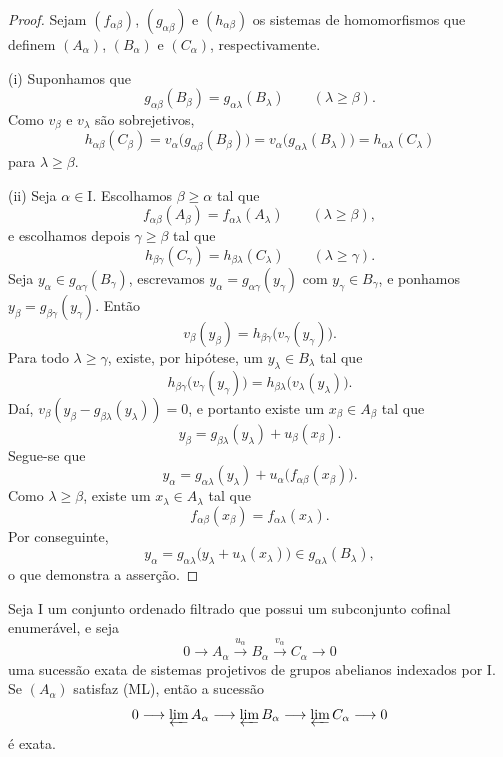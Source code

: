 \begin{proof}
Sejam $(f_{\alpha\beta})$, $(g_{\alpha\beta})$ e
$(h_{\alpha\beta})$ os sistemas de homomorfismos que definem
$(A_\alpha)$, $(B_\alpha)$ e $(C_\alpha)$, respectivamente.

(i) Suponhamos que
\[
  g_{\alpha\beta}(B_\beta)
  =
  g_{\alpha\lambda}(B_\lambda)
  \qquad(\lambda\geq\beta).
\]
Como $v_\beta$ e $v_\lambda$ são sobrejetivos,
\[
  h_{\alpha\beta}(C_\beta)
  =
  v_\alpha\bigl(g_{\alpha\beta}(B_\beta)\bigr)
  =
  v_\alpha\bigl(g_{\alpha\lambda}(B_\lambda)\bigr)
  =
  h_{\alpha\lambda}(C_\lambda)
\]
para $\lambda\geq\beta$.

(ii) Seja $\alpha\in\mathrm{I}$.
Escolhamos $\beta\geq\alpha$ tal que
\[
  f_{\alpha\beta}(A_\beta)
  =
  f_{\alpha\lambda}(A_\lambda)
  \qquad(\lambda\geq\beta),
\]
e escolhamos depois $\gamma\geq\beta$ tal que
\[
  h_{\beta\gamma}(C_\gamma)
  =
  h_{\beta\lambda}(C_\lambda)
  \qquad(\lambda\geq\gamma).
\]
Seja $y_\alpha\in g_{\alpha\gamma}(B_\gamma)$, escrevamos
$y_\alpha=g_{\alpha\gamma}(y_\gamma)$ com $y_\gamma\in B_\gamma$,
e ponhamos $y_\beta=g_{\beta\gamma}(y_\gamma)$.
Então
\[
  v_\beta(y_\beta)
  =
  h_{\beta\gamma}\bigl(v_\gamma(y_\gamma)\bigr).
\]
Para todo $\lambda\geq\gamma$, existe, por hipótese, um
$y_\lambda\in B_\lambda$ tal que
\[
  h_{\beta\gamma}\bigl(v_\gamma(y_\gamma)\bigr)
  =
  h_{\beta\lambda}\bigl(v_\lambda(y_\lambda)\bigr).
\]
Daí,
$v_\beta(y_\beta-g_{\beta\lambda}(y_\lambda))=0$, e portanto
existe um $x_\beta\in A_\beta$
tal que
\[
  y_\beta
  =
  g_{\beta\lambda}(y_\lambda)+u_\beta(x_\beta).
\]
Segue-se que
\[
  y_\alpha
  =
  g_{\alpha\lambda}(y_\lambda)
  +
  u_\alpha\bigl(f_{\alpha\beta}(x_\beta)\bigr).
\]
Como $\lambda\geq\beta$, existe um $x_\lambda\in A_\lambda$ tal
que
\[
  f_{\alpha\beta}(x_\beta)=f_{\alpha\lambda}(x_\lambda).
\]
Por conseguinte,
\[
  y_\alpha
  =
  g_{\alpha\lambda}
  \bigl(y_\lambda+u_\lambda(x_\lambda)\bigr)
  \in g_{\alpha\lambda}(B_\lambda),
\]
o que demonstra a asserção.
\end{proof}

\begin{proposition}[13.2.2]
\label{0.13.2.2}
Seja $\mathrm{I}$ um conjunto ordenado filtrado que possui um subconjunto
cofinal enumerável, e seja
\[
  0\longrightarrow A_\alpha
  \xrightarrow{u_\alpha}B_\alpha
  \xrightarrow{v_\alpha}C_\alpha
  \longrightarrow0
\]
uma sucessão exata de sistemas projetivos de grupos abelianos indexados
por $\mathrm{I}$.
Se $(A_\alpha)$ satisfaz {\rm(ML)}, então a sucessão
\[
  0\longrightarrow\varprojlim A_\alpha
  \longrightarrow\varprojlim B_\alpha
  \longrightarrow\varprojlim C_\alpha
  \longrightarrow0
\]
é exata.
\end{proposition}

